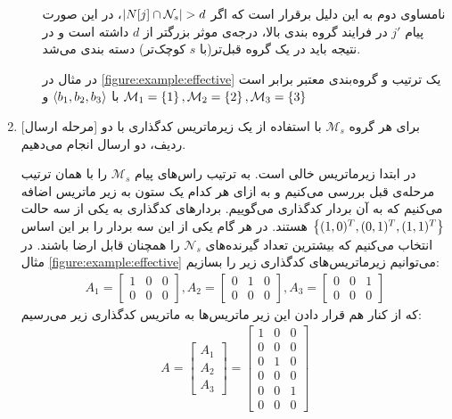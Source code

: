 \begin{enumerate}
\begin{enumerate}
			 نامساوی دوم به این دلیل برقرار است که اگر
			 $\left|{N[j] \cap \mathcal{N}_s }\right| > d$،
			 در این صورت پیام
			 $j'$
			 در فرایند گروه بندی بالا، درجه‌ی موثر بزرگتر از
			 $d$
			 داشته است و در نتیجه باید در یک گروه قبل‌تر(با
			 $s$
			 کوچک‌تر) دسته بندی می‌شد.
			 
			 در مثال در
			 \autoref{figure:example:effective}
			 یک ترتیب و گروه‌بندی معتبر برابر است با
			 $\left< b_1, b_2, b_3 \right>$
			 و
			 $\mathcal{M}_1 = \left\{ 1 \right\}, \mathcal{M}_2 = \left\{ 2 \right\}, \mathcal{M}_3 = \left\{ 3 \right\}$
		\end{enumerate}
	\item{[مرحله ارسال]}
	برای هر گروه
	$\mathcal{M}_s$
	با استفاده از یک زیرماتریس کدگذاری با دو ردیف، دو ارسال انجام می‌دهیم.
	
	در ابتدا زیرماتریس خالی است. به ترتیب راس‌های پیام
	$\mathcal{M}_s$
	را با همان ترتیب مرحله‌ی قبل بررسی می‌کنیم و به ازای هر کدام یک ستون به زیر ماتریس اضافه می‌کنیم که به آن بردار کدگذاری می‌گوییم. بردارهای کدگذاری به یکی از سه حالت
	$\left\{ (1, 0)^T, (0, 1)^T, (1, 1)^T \right\}$
	هستند. در هر گام یکی از این سه بردار را بر این اساس انتخاب می‌کنیم که بیشترین تعداد گیرنده‌های
	$\mathcal{N}_s$
	را همچنان قابل ارضا باشند. در مثال
	\autoref{figure:example:effective}
	می‌توانیم زیرماتریس‌های کدگذاری زیر را بسازیم:
	\begin{align*}
		A_1 = \begin{bmatrix}
			1 & 0 & 0 \\
			0 & 0 & 0
		\end{bmatrix}, 
		A_2 =   \begin{bmatrix}
			0 & 1 & 0 \\
			0 & 0 & 0
		\end{bmatrix},
		A_3 =   \begin{bmatrix}
			0 & 0 & 1 \\
			0 & 0 & 0
		\end{bmatrix}
	\end{align*}
	که از کنار هم قرار دادن این زیر ماتریس‌ها به ماتریس کدگذاری زیر می‌رسیم:
		\begin{align*}
		A =  \begin{bmatrix}
			A_1\\
			A_2\\
			A_3
				\end{bmatrix}
			= \begin{bmatrix}
			1 & 0 & 0 \\
			0 & 0 & 0 \\
			0 & 1 & 0 \\
			0 & 0 & 0 \\
			0 & 0 & 1 \\
			0 & 0 & 0
		\end{bmatrix}
			\end{align*}
\end{enumerate}
